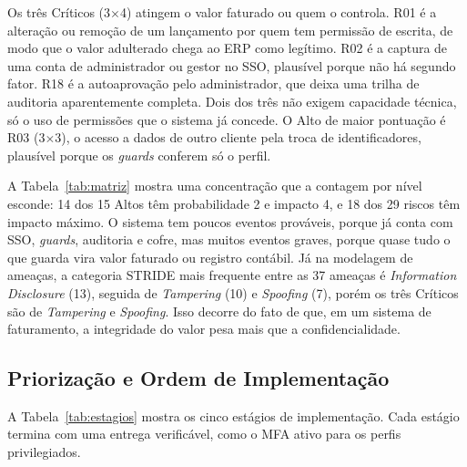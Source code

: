 \documentclass[conference]{IEEEtran}
\begin{document}
Os três Críticos (3$\times$4) atingem o valor faturado ou quem o controla. R01 é a alteração ou remoção de um lançamento por quem tem permissão de escrita, de modo que o valor adulterado chega ao ERP como legítimo. R02 é a captura de uma conta de administrador ou gestor no SSO, plausível porque não há segundo fator. R18 é a autoaprovação pelo administrador, que deixa uma trilha de auditoria aparentemente completa. Dois dos três não exigem capacidade técnica, só o uso de permissões que o sistema já concede. O Alto de maior pontuação é R03 (3$\times$3), o acesso a dados de outro cliente pela troca de identificadores, plausível porque os \textit{guards} conferem só o perfil.

A Tabela~\ref{tab:matriz} mostra uma concentração que a contagem por nível esconde: 14 dos 15 Altos têm probabilidade 2 e impacto 4, e 18 dos 29 riscos têm impacto máximo. O sistema tem poucos eventos prováveis, porque já conta com SSO, \textit{guards}, auditoria e cofre, mas muitos eventos graves, porque quase tudo o que guarda vira valor faturado ou registro contábil. Já na modelagem de ameaças, a categoria STRIDE mais frequente entre as 37 ameaças é \textit{Information Disclosure} (13), seguida de \textit{Tampering} (10) e \textit{Spoofing} (7), porém os três Críticos são de \textit{Tampering} e \textit{Spoofing}. Isso decorre do fato de que, em um sistema de faturamento, a integridade do valor pesa mais que a confidencialidade.

\subsection{Priorização e Ordem de Implementação}
\label{subsec:estagios}

A Tabela~\ref{tab:estagios} mostra os cinco estágios de implementação. Cada estágio termina com uma entrega verificável, como o MFA ativo para os perfis privilegiados.
\end{document}
